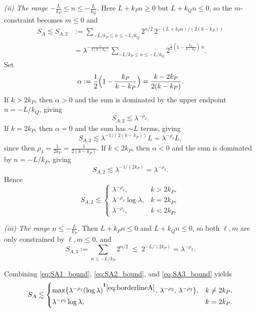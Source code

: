 \documentclass[10pt]{amsart}
\numberwithin{equation}{section}
\theoremstyle{definition}
\theoremstyle{remark}
\theoremstyle{remark}
\begin{document}
	\smallskip
	\noindent\emph{(ii) The range $-\frac{L}{k_P}\le n\le -\frac{L}{k_Q}$.}
	Here $L+k_P n\ge 0$ but $L+k_Q n\le 0$, so the $m$-constraint becomes $m\le 0$ and
	\begin{align*}
		S_A\lesssim S_{A,2}
		&:=\sum_{-L/k_P\le n\le -L/k_Q}
		2^{n/2}\,2^{-(L+k_P n)/(2(k-k_P))}\\
		&=\lambda^{-\frac1{2(k-k_P)}}\sum_{-L/k_P\le n\le -L/k_Q}
		2^{\frac12(1-\frac{k_P}{k-k_P})\,n}.
	\end{align*}
	Set
	\[
	\alpha:=\frac12\Bigl(1-\frac{k_P}{k-k_P}\Bigr)=\frac{k-2k_P}{2(k-k_P)}.
	\]
	If $k>2k_P$, then $\alpha>0$ and the sum is dominated by the upper endpoint $n=-L/k_Q$, giving
	\[
	S_{A,2}\lesssim \lambda^{-\rho_2}.
	\]
	If $k=2k_P$, then $\alpha=0$ and the sum has $\sim L$ terms, giving
	\[
	S_{A,2}\lesssim \lambda^{-1/(2(k-k_P))}L
	=\lambda^{-\rho_3}L,
	\]
	since then $\rho_3=\frac1{2k_P}=\frac1{2(k-k_P)}$.
	If $k<2k_P$, then $\alpha<0$ and the sum is dominated by $n=-L/k_P$, giving
	\[
	S_{A,2}\lesssim \lambda^{-1/(2k_P)}=\lambda^{-\rho_3}.
	\]
	Hence
	\begin{equation}\label{eq:SA2_bound}
		S_{A,2}\lesssim
		\begin{cases}
			\lambda^{-\rho_2},&k>2k_P,\\
			\lambda^{-\rho_3}\log\lambda,&k=2k_P,\\
			\lambda^{-\rho_3},&k<2k_P.
		\end{cases}
	\end{equation}
	
	\smallskip
	\noindent\emph{(iii) The range $n\le -\frac{L}{k_P}$.}
	Then $L+k_P n\le 0$ and $L+k_Q n\le 0$, so both $\ell,m$ are only constrained by $\ell,m\le 0$, and
	\begin{equation}\label{eq:SA3_bound}
		S_{A,3}:=\sum_{n\le -L/k_P}2^{n/2}\;\lesssim\;2^{-L/(2k_P)}=\lambda^{-\rho_3}.
	\end{equation}
	
	Combining \eqref{eq:SA1_bound}, \eqref{eq:SA2_bound}, and \eqref{eq:SA3_bound} yields
	\begin{equation}\label{eq:SA_final_rig}
		S_A\lesssim
		\begin{cases}
			\max\{\lambda^{-\rho_1}(\log\lambda)^{\mathbf 1_{\eqref{eq:borderlineA}}},\,\lambda^{-\rho_2},\,\lambda^{-\rho_3}\},&k\neq 2k_P,\\[2pt]
			\lambda^{-\rho_3}\log\lambda,&k=2k_P.
		\end{cases}
	\end{equation}
	
\end{document}
